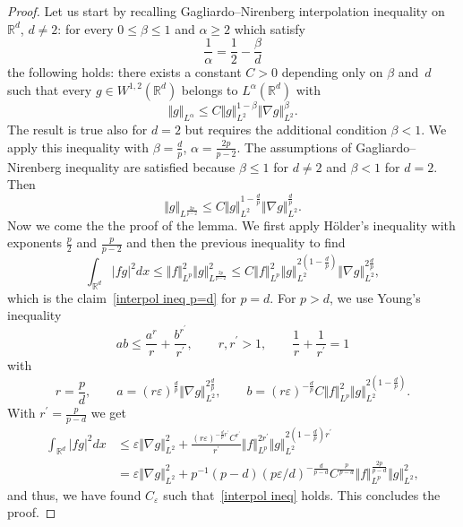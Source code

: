 \documentclass[a4paper,10pt]{article}
\newcommand\1{\mathbbm{1}}
\numberwithin{equation}{section}
\begin{document}
\begin{proof}
Let us start by recalling Gagliardo--Nirenberg interpolation inequality on $\mathbb{R}^{d} 
$, $d\neq2$: for every $0\leq\beta\leq1$ and $\alpha\geq2$ which satisfy
\begin{equation*}
\frac{1}{\alpha}=\frac{1}{2}-\frac{\beta}{d} 
\end{equation*}
the following holds:  there exists a constant $C > 0$ depending only on $\beta$ and~$d$ such that every $g \in W^{1,2}(\mathbb{R}^{d})$ belongs to $L^{\alpha}(\mathbb{R}^{d})$ with
\begin{equation*}
 \Vert g \Vert _{L^{\alpha}}\leq C \Vert g \Vert _{L^{2} 
}^{1-\beta} \Vert \nabla g \Vert_{L^{2}}^{\beta}.
\end{equation*}
The result is true also for $d=2$ but requires the additional condition $\beta<1$. We apply this inequality with $\beta=\frac{d}{p}$, $\alpha=\frac{2p}{p-2}$.
The assumptions of Gagliardo--Nirenberg inequality are satisfied because $\beta\leq1$ for $d\neq2$ and $\beta<1$ for $d=2$. Then
\begin{equation*}
 \Vert g \Vert _{L^{\frac{2p}{p-2}}}\leq C \Vert g \Vert
_{L^{2}}^{1-\frac{d}{p}} \Vert \nabla g \Vert_{L^{2}}^{\frac{d}{p} 
}.
\end{equation*}
Now we come the the proof of the lemma. We first apply H\"{o}lder's inequality with exponents $\frac{p}{2}$ and
$\frac{p}{p-2}$ and then the previous inequality to find
\begin{equation*}
\int_{\mathbb{R}^{d}} \vert fg \vert ^{2}dx \leq \Vert f \Vert_{L^{p}} 
^{2} \Vert g \Vert_{L^{\frac{2p}{p-2}}}^{2} \leq C\left\Vert f\right\Vert _{L^{p}} 
^{2}\left\Vert g\right\Vert _{L^{2}}^{2(1-\frac{d}{p})
}\left\Vert \nabla g\right\Vert _{L^{2}}^{2\frac{d}{p}},
\end{equation*}
which is the claim~\eqref{interpol ineq p=d} for $p=d$. For $p>d$, we use Young's
inequality 
\[
ab\leq\frac{a^{r}}{r}+\frac{b^{r^{\prime}}}{r^{\prime}},\qquad r,r^{\prime
}>1,\qquad\frac{1}{r}+\frac{1}{r^{\prime}}=1
\]
with
\[
r=\frac{p}{d},\qquad a=(r\varepsilon)  ^{\frac{d}{p}} \Vert
\nabla g \Vert _{L^{2}}^{2\frac{d}{p}},\qquad b=(r\varepsilon
)  ^{-\frac{d}{p}}C \Vert f \Vert _{L^{p}}^{2} \Vert
g \Vert _{L^{2}}^{2(1-\frac{d}{p})  }.
\]
With $r^{\prime}=\frac{p}{p-d}$ we get 
\begin{align*}
\int_{\mathbb{R}^{d}} \vert fg \vert ^{2}dx  &  \leq\varepsilon \Vert \nabla
g \Vert _{L^{2}}^{2}+\frac{(r\varepsilon)  ^{-\frac{d} 
{p}r^{\prime}}C^{r^{\prime}}}{r^{\prime}} \Vert f \Vert _{L^{p} 
}^{2r^{\prime}} \Vert g \Vert _{L^{2}}^{2(1-\frac{d} 
{p})  r^{\prime}}\\
&  =\varepsilon \Vert \nabla g \Vert _{L^{2}}^{2}+p^{-1}(
p-d)  (p\varepsilon/d)  ^{-\frac{d}{p-d}}C^{\frac{p}{p-d} 
} \Vert f \Vert _{L^{p}}^{\frac{2p}{p-d}} \Vert g \Vert
_{L^{2}}^{2},
\end{align*}
and thus, we have found $C_{\varepsilon}$ such that~\eqref{interpol ineq} holds. This concludes the proof.
\end{proof}
\end{document}
